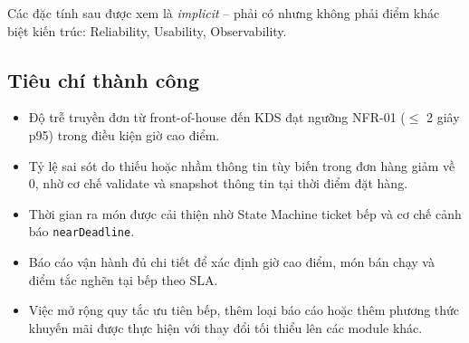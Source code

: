 Các đặc tính sau được xem là \textit{implicit} -- phải có nhưng không phải điểm khác biệt kiến trúc: Reliability, Usability, Observability.
 
\subsection{Tiêu chí thành công}
 
\begin{itemize}
  \item Độ trễ truyền đơn từ front-of-house đến KDS đạt ngưỡng NFR-01 ($\leq$ 2 giây p95) trong điều kiện giờ cao điểm.
  \item Tỷ lệ sai sót do thiếu hoặc nhầm thông tin tùy biến trong đơn hàng giảm về 0, nhờ cơ chế validate và snapshot thông tin tại thời điểm đặt hàng.
  \item Thời gian ra món được cải thiện nhờ State Machine ticket bếp và cơ chế cảnh báo \texttt{nearDeadline}.
  \item Báo cáo vận hành đủ chi tiết để xác định giờ cao điểm, món bán chạy và điểm tắc nghẽn tại bếp theo SLA.
  \item Việc mở rộng quy tắc ưu tiên bếp, thêm loại báo cáo hoặc thêm phương thức khuyến mãi được thực hiện với thay đổi tối thiểu lên các module khác.
\end{itemize}